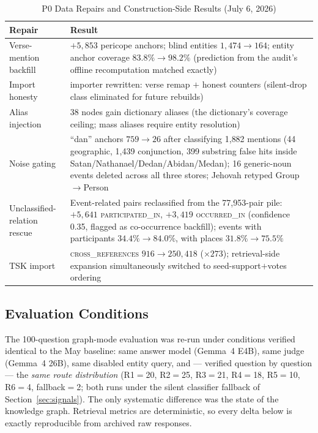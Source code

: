 \begin{table}[!t]
\caption{P0 Data Repairs and Construction-Side Results (July 6, 2026)}
\label{tab:p0}
\centering
\begin{threeparttable}
\begin{tabular}{@{}p{2.6cm}p{5.3cm}@{}}
\toprule
Repair & Result \\
\midrule
Verse-mention backfill & $+5{,}853$ pericope anchors; blind entities
$1{,}474 \to 164$; entity anchor coverage $83.8\% \to 98.2\%$ (prediction from
the audit's offline recomputation matched exactly) \\
Import honesty & importer rewritten: verse remap $+$ honest counters
(silent-drop class eliminated for future rebuilds) \\
Alias injection & 38 nodes gain dictionary aliases (the dictionary's
coverage ceiling; mass aliases require entity resolution) \\
Noise gating & ``dan'' anchors $759 \to 26$ after classifying 1{,}882
mentions (44 geographic, 1{,}439 conjunction, 399 substring false hits
inside Satan/Nathanael/Dedan/Abidan/Medan); 16 generic-noun events
deleted across all three stores; Jehovah retyped Group$\to$Person \\
Unclassified-relation rescue & Event-related pairs reclassified from the
77{,}953-pair pile: $+5{,}641$ \textsc{participated\_in}, $+3{,}419$
\textsc{occurred\_in} (confidence 0.35, flagged as co-occurrence
backfill); events with participants $34.4\% \to 84.0\%$, with places
$31.8\% \to 75.5\%$ \\
TSK import & \textsc{cross\_references} $916 \to 250{,}418$ ($\times
273$); retrieval-side expansion simultaneously switched to
seed-support$+$votes ordering \\
\bottomrule
\end{tabular}
\end{threeparttable}
\end{table}

\subsection{Evaluation Conditions}

The 100-question graph-mode evaluation was re-run under conditions
verified identical to the May baseline: same answer model (Gemma~4 E4B),
same judge (Gemma~4 26B), same disabled entity query, and --- verified
question by question --- the \emph{same route distribution}
(R1$=$20, R2$=$25, R3$=$21, R4$=$18, R5$=$10, R6$=$4, fallback$=$2;
both runs under the silent classifier fallback of
Section~\ref{sec:signals}). The only systematic difference was the state
of the knowledge graph.
Retrieval metrics are deterministic, so every delta below is exactly
reproducible from archived raw responses.

